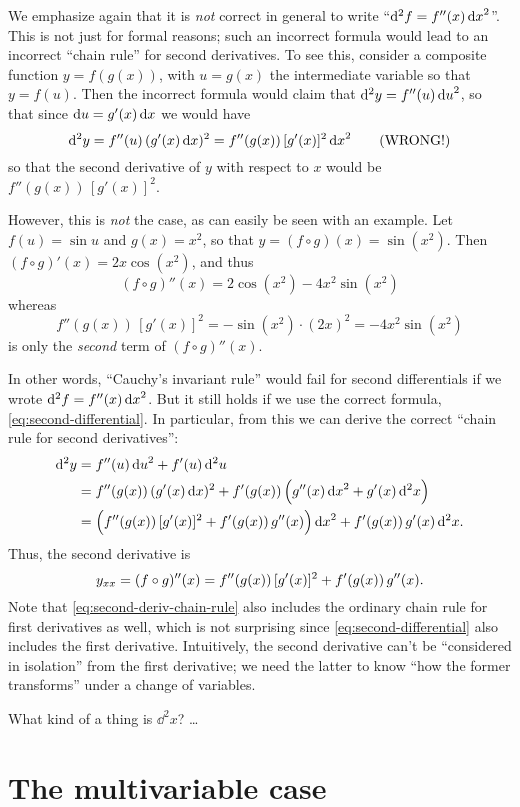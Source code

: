 \begin{rmk}
  We emphasize again that it is \emph{not} correct in general to write ``$\mathrm{d}^2f = f''(x) \,{\mathrm{d} x}^2$''.
  This is not just for formal reasons; such an incorrect formula would lead to an incorrect ``chain rule'' for second derivatives.
  To see this, consider a composite function $y = f(g(x))$, with $u = g(x)$ the intermediate variable so that $y = f(u)$.
  Then the incorrect formula would claim that $\mathrm{d}^2y = f''(u)\,{\mathrm{d} u}^2 $, so that since ${\mathrm{d} u} = g'(x) \,{\mathrm{d} x}$ we would have
  \[ \mathrm{d}^2y = f''(u)\,(g'(x)\,{\mathrm{d} x})^2 = f''(g(x))\, [g'(x)]^2 \,{\mathrm{d} x}^2 \qquad\text{(WRONG!)} \]
  so that the second derivative of $y$ with respect to $x$ would be $f''(g(x))\, [g'(x)]^2$.

  However, this is \emph{not} the case, as can easily be seen with an example.
  Let $f(u) = \sin u$ and $g(x) = x^2$, so that $y = (f\circ g)(x) = \sin(x^2)$.
  Then $(f\circ g)'(x) = 2x\cos (x^2)$, and thus
  \[ (f\circ g)''(x) = 2 \cos (x^2) - 4x^2 \sin(x^2) \]
  whereas
  \[ f''(g(x))\, [g'(x)]^2 = -\sin(x^2) \cdot (2x)^2 = -4x^2\sin(x^2) \]
  is only the \emph{second} term of $(f\circ g)''(x)$.

  In other words, ``Cauchy's invariant rule'' would fail for second differentials if we wrote $\mathrm{d}^2f = f''(x) \,{\mathrm{d} x}^2$.
  But it still holds if we use the correct formula, \cref{eq:second-differential}.
  In particular, from this we can derive the correct ``chain rule for second derivatives'':
  \begin{align}
    \mathrm{d}^2y &= f''(u) \,{\mathrm{d} u}^2 + f'(u) \,\mathrm{d}^2u \notag\\
    &= f''(g(x)) \, (g'(x) \, {\mathrm{d} x})^2 + f'(g(x)) \, \Big(g''(x) \, {\mathrm{d} x}^2 + g'(x) \, \mathrm{d}^2 x\Big) \notag\\
    &= \Big( f''(g(x)) \,[g'(x)]^2 + f'(g(x))\, g''(x)\Big) \, {\mathrm{d} x}^2 + f'(g(x))\, g'(x)\,\mathrm{d}^2x. \label{eq:second-deriv-chain-rule}
  \end{align}
  Thus, the second derivative is
  \[ {y}_{{x}{x}} = (f\circ g)''(x) = f''(g(x)) \,[g'(x)]^2 + f'(g(x))\, g''(x). \]
  Note that \cref{eq:second-deriv-chain-rule} also includes the ordinary chain rule for first derivatives as well, which is not surprising since \cref{eq:second-differential} also includes the first derivative.
  Intuitively, the second derivative can't be ``considered in isolation'' from the first derivative; we need the latter to know ``how the former transforms'' under a change of variables.
\end{rmk}

What kind of a thing is $\dd^2x$? \dots %

\section{The multivariable case}
\label{sec:multivariable-second-differentials}

